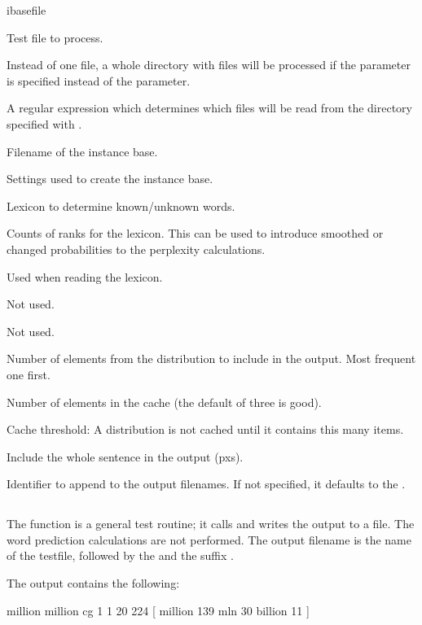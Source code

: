 \documentclass[a4paper,10pt,twoside]{report}
\begin{document}
\begin{varlist}{ibasefile}
\item[filename] Test file to process.
\item[dir] Instead of one file, a whole directory with files will be
  processed if the  parameter is specified instead of the
   parameter.
\item[dirmatch] A regular expression which determines which files will
  be read from the directory specified with .
\item[ibasefile] Filename of the instance base.
\item[timbl] Settings used to create the instance base.
\item[lexicon] Lexicon to determine known/unknown words.
\item[counts] Counts of ranks for the lexicon. This can be used to
  introduce smoothed or changed probabilities to the perplexity
  calculations. 
\item[hapax] Used when reading the lexicon.
\item[lc] Not used.
\item[rc] Not used.
\item[topn] Number of elements from the \Timbl{} distribution to
  include in the output. Most frequent one first.
\item[cache] Number of elements in the cache (the default of three is
  good). 
\item[cth] Cache threshold: A distribution is not cached until it
  contains this many items.
\item[is] Include the whole sentence in the output (pxs).
\item[id] Identifier to append to the output filenames. If not
  specified, it defaults to the \pid{}.
\end{varlist}

\subsection{}

The  function is a general test routine; it calls \Timbl{} and
writes the output to a file. The word prediction calculations are not
performed. The output filename is the name of the testfile, followed
by the  and the suffix .

The output contains the following:

\begin{wout}{}
million million cg 1 1 20 224 [ million 139 mln 30 billion 11 ]
\end{wout}
\end{document}
